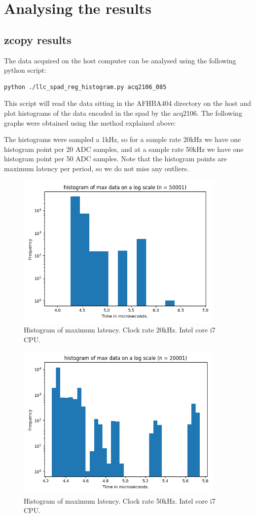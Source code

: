 \documentclass{article}
\begin{document}
\section{Analysing the results}
\subsection{zcopy results}
The data acquired on the host computer can be analysed using the following python script:

\begin{verbatim}
python ./llc_spad_reg_histogram.py acq2106_085
\end{verbatim}

This script will read the data sitting in the AFHBA404 directory on the host and plot histograms of the data encoded in the spad by the acq2106.
The following graphs were obtained using the method explained above:

The histograms were sampled a 1kHz, so for a sample rate 20kHz we have one histogram point per 20 ADC samples, and at a sample rate 50kHz we have one histogram point per 50 ADC samples.
Note that the histogram points are maximum latency per period, so we do not miss any outliers.

\begin{figure}
	\centering
	\includegraphics[width=4.0in]{images/zcopy_20kHz.png}
	\caption{Histogram of maximum latency. Clock rate 20kHz. Intel core i7 CPU.}
	\label{zcopy20hist}
\end{figure}

\begin{figure}
	\centering
	\includegraphics[width=4.0in]{images/zcopy_50kHz.png}
	\caption{Histogram of maximum latency. Clock rate 50kHz. Intel core i7 CPU.}
	\label{zcopy50hist}
\end{figure}
\end{document}
